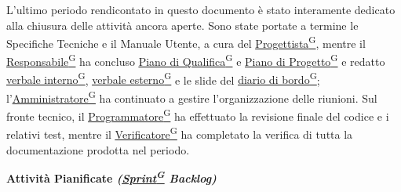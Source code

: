 \documentclass[a4paper,12pt]{article}
\providecommand{\glslink}[2]{\href{https://alittlebyte-19.github.io/Documentazione/glossario.html\#gls-#1}{\underline{#2}\textsuperscript{\scriptsize G}}}
\begin{document}
L'ultimo periodo rendicontato in questo documento è stato interamente dedicato alla chiusura delle attività ancora aperte. Sono state portate a termine le Specifiche Tecniche e il Manuale Utente, a cura del \glslink{progettista}{Progettista}, mentre il \glslink{responsabile}{Responsabile} ha concluso \glslink{piano-di-qualifica}{Piano di Qualifica} e \glslink{piano-di-progetto}{Piano di Progetto} e redatto \glslink{verbale-interno}{verbale interno}, \glslink{verbale-esterno}{verbale esterno} e le slide del \glslink{diario-di-bordo}{diario di bordo}; l'\glslink{amministratore}{Amministratore} ha continuato a gestire l'organizzazione delle riunioni. Sul fronte tecnico, il \glslink{programmatore}{Programmatore} ha effettuato la revisione finale del codice e i relativi test, mentre il \glslink{verificatore}{Verificatore} ha completato la verifica di tutta la documentazione prodotta nel periodo.

\begin{center}
\noindent\textbf{Attività Pianificate \textit{(\glslink{sprint}{Sprint} Backlog)}}\\
\end{center}
\end{document}

